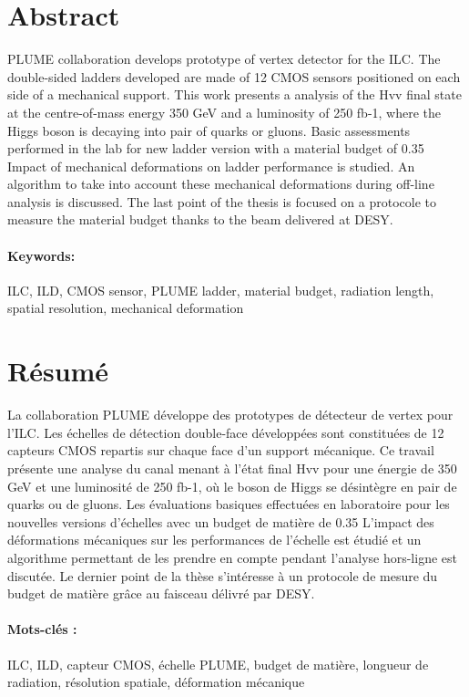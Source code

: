 \section*{Abstract}

PLUME collaboration develops prototype of vertex detector for the ILC. 
The double-sided ladders developed are made of 12 CMOS sensors positioned on each side of a mechanical support.
This work presents a analysis of the Hvv final state at the centre-of-mass energy 350 GeV and a luminosity of 250 fb-1, where the Higgs boson is decaying into pair of quarks or gluons.
Basic assessments performed in the lab for new ladder version with a material budget of 0.35 %
Impact of mechanical deformations on ladder performance is studied.
An algorithm to take into account these mechanical deformations during off-line analysis is discussed.
The last point of the thesis is focused on a protocole to measure the material budget thanks to the beam delivered at DESY.
 
\paragraph{Keywords:} ILC, ILD, CMOS sensor, PLUME ladder, material budget, radiation length, spatial resolution, mechanical deformation

\newpage

\section*{Résumé}

La collaboration PLUME développe des prototypes de détecteur de vertex pour l’ILC.  
Les échelles de détection double-face développées sont constituées de 12 capteurs CMOS repartis sur chaque face d’un support mécanique.
Ce travail présente une analyse du canal menant à l’état final Hvv pour une énergie de 350 GeV et une luminosité de 250 fb-1, où le boson de Higgs se désintègre en pair de quarks ou de gluons. 
Les évaluations basiques effectuées en laboratoire pour les nouvelles versions d’échelles avec un budget de matière de 0.35%
L’impact des déformations mécaniques sur les performances de l’échelle est étudié et un algorithme permettant de les prendre en compte pendant l’analyse hors-ligne est discutée.
Le dernier point de la thèse s’intéresse à un protocole de mesure du budget de matière grâce au faisceau délivré par DESY.

\paragraph{Mots-clés :} ILC, ILD, capteur CMOS, échelle PLUME, budget de matière, longueur de radiation, résolution spatiale, déformation mécanique
